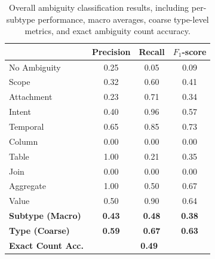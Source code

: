 \begin{table}[htbp]
    \centering
    \begin{tabular}{lccc}
        & Precision & Recall & $F_1$-score \\
        \midrule
        No Ambiguity & 0.25 & 0.05 & 0.09 \\
        Scope        & 0.32 & 0.60 & 0.41 \\
        Attachment   & 0.23 & 0.71 & 0.34 \\
        Intent       & 0.40 & 0.96 & 0.57 \\
        Temporal     & 0.65 & 0.85 & 0.73 \\
        Column       & 0.00 & 0.00 & 0.00 \\
        Table        & 1.00 & 0.21 & 0.35 \\
        Join         & 0.00 & 0.00 & 0.00 \\
        Aggregate    & 1.00 & 0.50 & 0.67 \\
        Value        & 0.50 & 0.90 & 0.64 \\
        \midrule
        \textbf{Subtype (Macro)} & \textbf{0.43} & \textbf{0.48} & \textbf{0.38} \\
        \textbf{Type (Coarse)}   & \textbf{0.59} & \textbf{0.67} & \textbf{0.63} \\
        \textbf{Exact Count Acc.} & \multicolumn{3}{c}{\textbf{0.49}} \\
    \end{tabular}
    \caption{Overall ambiguity classification results, including per-subtype performance, macro averages, coarse type-level metrics, and exact ambiguity count accuracy.}
    \label{tab:unified_evaluation_summary}
\end{table}